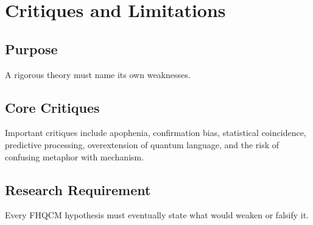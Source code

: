 \chapter{Critiques and Limitations}

\section{Purpose}

A rigorous theory must name its own weaknesses.

\section{Core Critiques}

Important critiques include apophenia, confirmation bias, statistical coincidence, predictive processing, overextension of quantum language, and the risk of confusing metaphor with mechanism.

\section{Research Requirement}

Every FHQCM hypothesis must eventually state what would weaken or falsify it.
